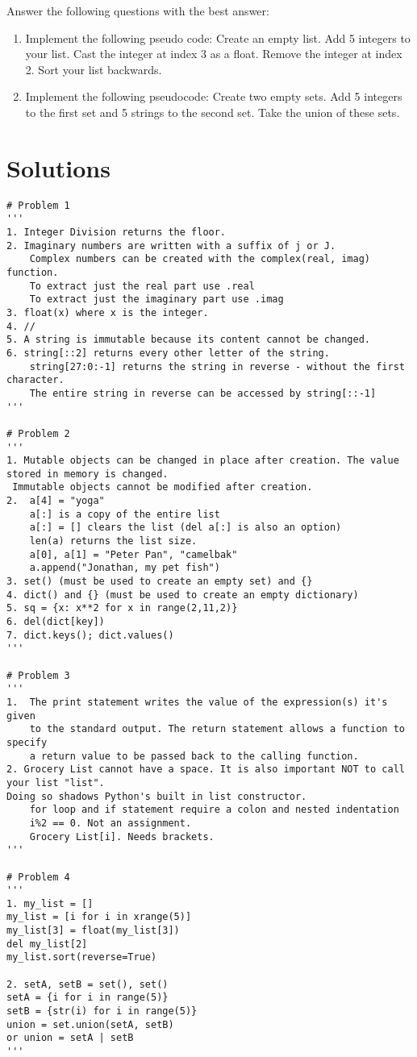 \begin{problem}
Answer the following questions with the best answer:

\begin{enumerate}
\item Implement the following pseudo code: Create an empty list. 
Add 5 integers to your list. 
Cast the integer at index 3 as a float.
Remove the integer at index 2. 
Sort your list backwards. 
\item Implement the following pseudocode: Create two empty sets.
Add 5 integers to the first set and 5 strings to the second set.
Take the union of these sets.

\end{enumerate}
\end{problem}




\newpage
\section{Solutions}

\begin{lstlisting}
# Problem 1
'''
1. Integer Division returns the floor.
2. Imaginary numbers are written with a suffix of j or J.
	Complex numbers can be created with the complex(real, imag) function.
	To extract just the real part use .real
	To extract just the imaginary part use .imag
3. float(x) where x is the integer.
4. //
5. A string is immutable because its content cannot be changed. 
6. string[::2] returns every other letter of the string. 
	string[27:0:-1] returns the string in reverse - without the first character.
	The entire string in reverse can be accessed by string[::-1]
'''

# Problem 2	
'''
1. Mutable objects can be changed in place after creation. The value stored in memory is changed.
 Immutable objects cannot be modified after creation. 
2.  a[4] = "yoga"
	a[:] is a copy of the entire list
	a[:] = [] clears the list (del a[:] is also an option)
	len(a) returns the list size. 
	a[0], a[1] = "Peter Pan", "camelbak"
	a.append("Jonathan, my pet fish")
3. set() (must be used to create an empty set) and {}
4. dict() and {} (must be used to create an empty dictionary)
5. sq = {x: x**2 for x in range(2,11,2)}
6. del(dict[key])
7. dict.keys(); dict.values()
'''

# Problem 3
'''	
1. 	The print statement writes the value of the expression(s) it's given 
	to the standard output. The return statement allows a function to specify 
	a return value to be passed back to the calling function. 
2. Grocery List cannot have a space. It is also important NOT to call your list "list". 
Doing so shadows Python's built in list constructor. 
	for loop and if statement require a colon and nested indentation
	i%2 == 0. Not an assignment. 
	Grocery List[i]. Needs brackets.
'''

# Problem 4
'''
1. my_list = []
my_list = [i for i in xrange(5)]
my_list[3] = float(my_list[3])
del my_list[2]
my_list.sort(reverse=True)

2. setA, setB = set(), set()
setA = {i for i in range(5)}
setB = {str(i) for i in range(5)}
union = set.union(setA, setB)
or union = setA | setB
'''


\end{lstlisting}	
	